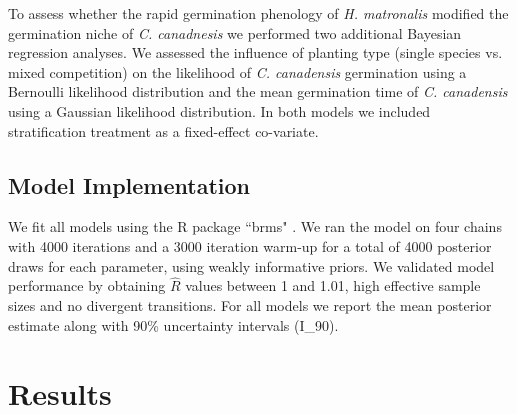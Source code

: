 \documentclass{article}[11pt]
\begin{document}
To assess whether the rapid germination phenology of \textit{H. matronalis} modified the germination niche of \textit{C. canadnesis} we performed two additional Bayesian regression analyses. We assessed the influence of planting type (single species vs. mixed competition) on the likelihood of \textit{C. canadensis} germination using a Bernoulli likelihood distribution and the mean germination time of \textit{C. canadensis} using a Gaussian likelihood distribution. In both models we included stratification treatment as a fixed-effect co-variate.

\subsection*{Model Implementation}
\noindent We fit all models using the R package ``brms" \citep{Burkner2018}.  We ran the model on four chains with 4000 iterations and a 3000 iteration warm-up for a total of 4000 posterior draws for each parameter, using weakly informative priors. We validated model performance by obtaining $\hat{R}$ values between 1 and 1.01, high effective sample sizes and no divergent transitions. For all models we report the mean posterior estimate along with 90\% uncertainty intervals (I_{90}).

\section*{Results}
\end{document}
